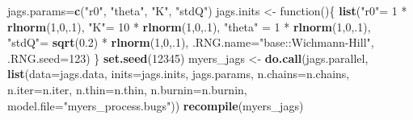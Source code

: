 \documentclass[author-year, review]{elsarticle} %
\newenvironment{Shaded}{}{}
\newcommand{\KeywordTok}[1]{\textcolor[rgb]{0.00,0.44,0.13}{\textbf{{#1}}}}
\newcommand{\DataTypeTok}[1]{\textcolor[rgb]{0.56,0.13,0.00}{{#1}}}
\newcommand{\DecValTok}[1]{\textcolor[rgb]{0.25,0.63,0.44}{{#1}}}
\newcommand{\FloatTok}[1]{\textcolor[rgb]{0.25,0.63,0.44}{{#1}}}
\newcommand{\StringTok}[1]{\textcolor[rgb]{0.25,0.44,0.63}{{#1}}}
\newcommand{\NormalTok}[1]{{#1}}
\begin{document}
\begin{Shaded}
\begin{Highlighting}[]
\NormalTok{jags.params=}\KeywordTok{c}\NormalTok{(}\StringTok{"r0"}\NormalTok{, }\StringTok{"theta"}\NormalTok{, }\StringTok{"K"}\NormalTok{, }\StringTok{"stdQ"}\NormalTok{)}
\NormalTok{jags.inits <- function()\{}
  \KeywordTok{list}\NormalTok{(}\StringTok{"r0"}\NormalTok{= }\DecValTok{1} \NormalTok{* }\KeywordTok{rlnorm}\NormalTok{(}\DecValTok{1}\NormalTok{,}\DecValTok{0}\NormalTok{,.}\DecValTok{1}\NormalTok{), }
       \StringTok{"K"}\NormalTok{=    }\DecValTok{10} \NormalTok{* }\KeywordTok{rlnorm}\NormalTok{(}\DecValTok{1}\NormalTok{,}\DecValTok{0}\NormalTok{,.}\DecValTok{1}\NormalTok{),}
       \StringTok{"theta"} \NormalTok{= }\DecValTok{1} \NormalTok{* }\KeywordTok{rlnorm}\NormalTok{(}\DecValTok{1}\NormalTok{,}\DecValTok{0}\NormalTok{,.}\DecValTok{1}\NormalTok{),  }
       \StringTok{"stdQ"}\NormalTok{= }\KeywordTok{sqrt}\NormalTok{(}\FloatTok{0.2}\NormalTok{) * }\KeywordTok{rlnorm}\NormalTok{(}\DecValTok{1}\NormalTok{,}\DecValTok{0}\NormalTok{,.}\DecValTok{1}\NormalTok{),}
       \DataTypeTok{.RNG.name=}\StringTok{"base::Wichmann-Hill"}\NormalTok{, }\DataTypeTok{.RNG.seed=}\DecValTok{123}\NormalTok{)}
\NormalTok{\}}
\KeywordTok{set.seed}\NormalTok{(}\DecValTok{12345}\NormalTok{)}
\NormalTok{myers_jags <- }\KeywordTok{do.call}\NormalTok{(jags.parallel, }
                      \KeywordTok{list}\NormalTok{(}\DataTypeTok{data=}\NormalTok{jags.data, }\DataTypeTok{inits=}\NormalTok{jags.inits, }
                                                     \NormalTok{jags.params, }\DataTypeTok{n.chains=}\NormalTok{n.chains, }
                                                     \DataTypeTok{n.iter=}\NormalTok{n.iter, }\DataTypeTok{n.thin=}\NormalTok{n.thin,}
                           \DataTypeTok{n.burnin=}\NormalTok{n.burnin, }
                           \DataTypeTok{model.file=}\StringTok{"myers_process.bugs"}\NormalTok{))}
\KeywordTok{recompile}\NormalTok{(myers_jags)}
\end{Highlighting}
\end{Shaded}
\end{document}
